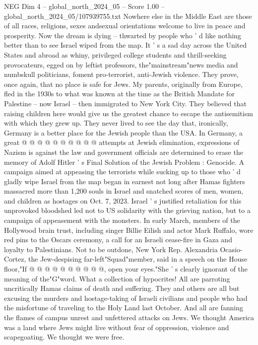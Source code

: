 \begin{textsample}{NEG Dim 4 – global\_north\_2024\_05 – Score 1.00 – global\_north\_2024\_05/107939755.txt}  \label{ex:f4_neg_130}
Nowhere else in the Middle East are those of all races, religions, sexes andsexual orientations welcome to live in peace and prosperity.
Now the dream is dying -- thwarted by people who ' d like nothing better than to see Israel wiped from the map.
It ' s a sad day across the United States and abroad as whiny, privileged college students and thrill-seeking provocateurs, egged on by leftist professors, the"mainstream"news media and numbskull politicians, foment pro-terrorist, anti-Jewish violence.
They prove, once again, that no place is safe for Jews.
My parents, originally from Europe, fled in the 1930s to what was known at the time as the British Mandate for Palestine -- now Israel -- then immigrated to New York City.
They believed that raising children here would give us the greatest chance to escape the antisemitism with which they grew up.
They never lived to see the day that, ironically, Germany is a better place for the Jewish people than the USA.
In Germany, a great @ @ @ @ @ @ @ @ @ @ attempts at Jewish elimination, expressions of Nazism is against the law and government officials are determined to erase the memory of Adolf Hitler ' s Final Solution of the Jewish Problem : Genocide.
A campaign aimed at appeasing the terrorists while sucking up to those who ' d gladly wipe Israel from the map began in earnest not long after Hamas fighters massacred more than 1,200 souls in Israel and snatched scores of men, women, and children as hostages on Oct. 7, 2023.
Israel ' s justified retaliation for this unprovoked bloodshed led not to US solidarity with the grieving nation, but to a campaign of appeasement with the monsters.
In early March, members of the Hollywood brain trust, including singer Billie Eilish and actor Mark Ruffalo, wore red pins to the Oscars ceremony, a call for an Israeli cease-fire in Gaza and loyalty to Palestinians.
Not to be outdone, New York Rep.
Alexandria Ocasio-Cortez, the Jew-despising far-left"Squad"member, said in a speech on the House floor,"If @ @ @ @ @ @ @ @ @ @, open your eyes."She ' s clearly ignorant of the meaning of the"G"word.
What a collection of hypocrites!
All are parroting uncritically Hamas claims of death and suffering.
They and others are all but excusing the murders and hostage-taking of Israeli civilians and people who had the misfortune of traveling to the Holy Land last October.
And all are fanning the flames of campus unrest and unfettered attacks on Jews.
We thought America was a land where Jews might live without fear of oppression, violence and scapegoating.
We thought we were free.

\end{textsample}
